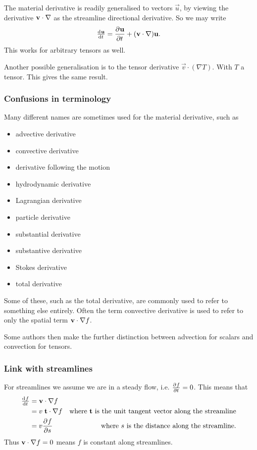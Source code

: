 The material derivative is readily generalised to vectors $\vec{u}$, by viewing the derivative $\bm{\mathrm{v}}\cdot \mathop{}\! \nabla$ as the streamline directional derivative. So we may write
\[ \od{\vec{u}}{t} = \pd{\vec{u}}{t} + (\vec{v}\cdot\nabla)\vec{u}. \]
This works for arbitrary tensors as well.

Another possible generalisation is to the tensor derivative $\vec{v}\cdot(\nabla T)$. With $T$ a tensor. This gives the same result.

\subsubsection{Confusions in terminology}
Many different names are sometimes used for the material derivative, such as
\begin{itemize}
\item advective derivative
\item convective derivative
\item derivative following the motion
\item hydrodynamic derivative
\item Lagrangian derivative
\item particle derivative
\item substantial derivative
\item substantive derivative
\item Stokes derivative
\item total derivative
\end{itemize}
Some of these, such as the total derivative, are commonly used to refer to something else entirely. Often the term convective derivative is used to refer to only the spatial term $\bm{\mathrm{v}}\cdot \mathop{}\! \nabla f$.

Some authors then make the further distinction between advection for scalars and convection for tensors.

\subsubsection{Link with streamlines}
For streamlines we assume we are in a steady flow, i.e. $ \frac{\partial{^{}}f}{\partial{{t}^{}}}  = 0$. This means that
\begin{align*}
\od{f}{t} &= \vec{v}\cdot \grad f \\
&= v \;\vec{t} \cdot \grad f & \text{where $\vec{t}$ is the unit tangent vector along the streamline} \\
&= v \pd{f}{s} & \text{where $s$ is the distance along the streamline.}
\end{align*}
Thus $\bm{\mathrm{v}}\cdot \mathop{}\! \nabla f = 0$ means $f$ is constant along streamlines.

